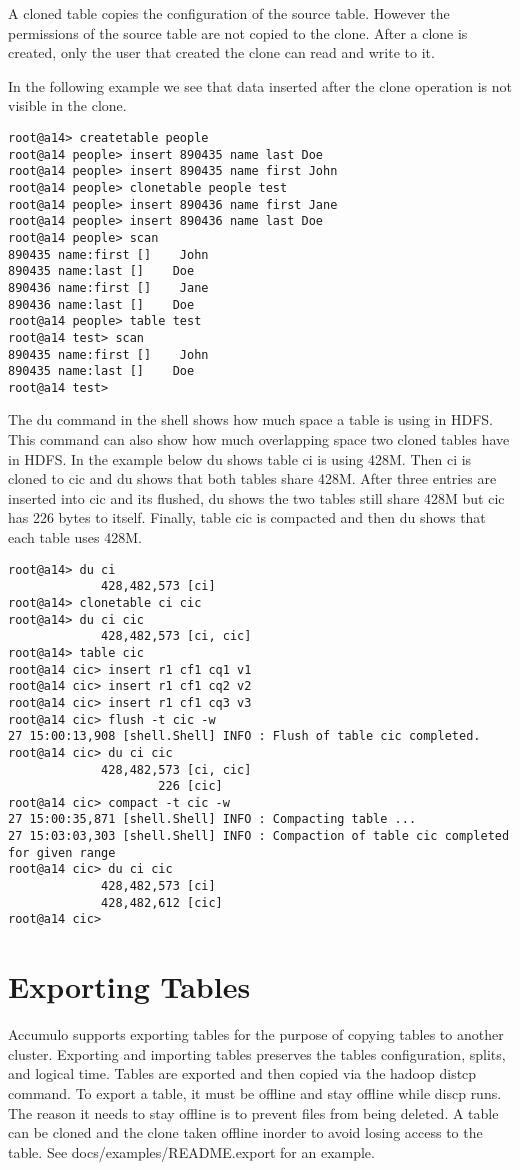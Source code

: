 A cloned table copies the configuration of the source table. However the
permissions of the source table are not copied to the clone. After a clone is
created, only the user that created the clone can read and write to it.

In the following example we see that data inserted after the clone operation is
not visible in the clone.

\begingroup\fontsize{8pt}{8pt}\selectfont\begin{verbatim}
root@a14> createtable people
root@a14 people> insert 890435 name last Doe
root@a14 people> insert 890435 name first John
root@a14 people> clonetable people test  
root@a14 people> insert 890436 name first Jane
root@a14 people> insert 890436 name last Doe  
root@a14 people> scan
890435 name:first []    John
890435 name:last []    Doe
890436 name:first []    Jane
890436 name:last []    Doe
root@a14 people> table test
root@a14 test> scan
890435 name:first []    John
890435 name:last []    Doe
root@a14 test> 
\end{verbatim}\endgroup

The du command in the shell shows how much space a table is using in HDFS.
This command can also show how much overlapping space two cloned tables have in
HDFS. In the example below du shows table ci is using 428M. Then ci is cloned
to cic and du shows that both tables share 428M. After three entries are
inserted into cic and its flushed, du shows the two tables still share 428M but
cic has 226 bytes to itself. Finally, table cic is compacted and then du shows
that each table uses 428M.

\begingroup\fontsize{8pt}{8pt}\selectfont\begin{verbatim}
root@a14> du ci           
             428,482,573 [ci]
root@a14> clonetable ci cic
root@a14> du ci cic
             428,482,573 [ci, cic]
root@a14> table cic
root@a14 cic> insert r1 cf1 cq1 v1
root@a14 cic> insert r1 cf1 cq2 v2
root@a14 cic> insert r1 cf1 cq3 v3 
root@a14 cic> flush -t cic -w 
27 15:00:13,908 [shell.Shell] INFO : Flush of table cic completed.
root@a14 cic> du ci cic       
             428,482,573 [ci, cic]
                     226 [cic]
root@a14 cic> compact -t cic -w
27 15:00:35,871 [shell.Shell] INFO : Compacting table ...
27 15:03:03,303 [shell.Shell] INFO : Compaction of table cic completed for given range
root@a14 cic> du ci cic        
             428,482,573 [ci]
             428,482,612 [cic]
root@a14 cic> 
\end{verbatim}\endgroup

\section{Exporting Tables}

Accumulo supports exporting tables for the purpose of copying tables to another
cluster. Exporting and importing tables preserves the tables configuration,
splits, and logical time. Tables are exported and then copied via the hadoop
distcp command. To export a table, it must be offline and stay offline while
discp runs. The reason it needs to stay offline is to prevent files from being
deleted. A table can be cloned and the clone taken offline inorder to avoid
losing access to the table. See docs/examples/README.export for an example.
